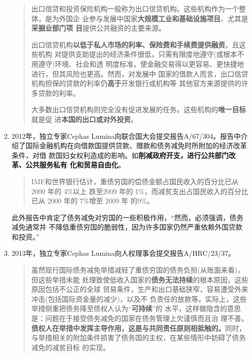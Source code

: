 \begin{enumerate}
\begin{quotation}
    出口信贷和投资保险机构一般称为出口信贷机构。这些机构作为一个整体，是为外国企
    业参与发展中国家\textbf{大规模工业和基础设施项目}、尤其是\textbf{采掘业部门项
      目}提供公共融资的主要来源。

    出口信贷机构\textbf{以低于私人市场的利率、保险费和手续费提供融资}，且这些机构
    对提供支助提出的经济条件很低，只需有限度地遵守(或根本不用遵守)环境、社会和透
    明度标准，使金融交易得以更容易、更快捷地进行，但其风险也更高。然而，对发展中
    国家的借款人而言，出口信贷机构担保的贷款的利率仍\textbf{高于}开发银行或机构等
    其他官方来源提供的许多贷款的利率。

    大多数出口信贷机构则完全没有促进发展的任务。这些机构的\textbf{唯一目标}就是促
    进\textbf{本国的出口或对外投资}。
  \end{quotation}

\item 2012年，独立专家Cephas Lumina向联合国大会提交报告A/67/304。报告中介
  绍了国际金融机构在向借款国提供贷款、赠款和债务减免时所附加的经济改革条件，对借
  款国妇女权利造成的影响。如\textbf{削减政府开支，进行公共部门改革、公共服务私有
    化和贸易自由化}。
  \begin{quotation}
    IMF和世界银行估计，重债穷国的偿债金额占国民收入的百分比已从 2000 年的 4\%以上
    跌至2009 年的 1\%，而减贫支出占国民收入的百分比已从 2000 年的 7\%增至 2009 年
    的9\%。
  \end{quotation}

  此外报告中肯定了债务减免对穷国的一些积极作用，“然而，必须强调，债务减免通常并
  不降低重债穷国的脆弱性，因为许多国家仍然严重依赖外国贷款和投资。”

\item 2013年，独立专家Cephas Lumina向人权理事会提交报告A/HRC/23/37。

  \begin{quotation}
    虽然现行国际债务减免举措减轻了重债穷国的债务负担(从账面来看)，但这些举措未能
    处理致使低收入国家的\textbf{债务无法持续}的根本原因，这些原因包括不公正的全球
    贸易条件，生产和出口基础狭窄，容易遭受外来冲击(包括国际资金量的减少)，以及不
    负责任的放款等。实际上，这些举措侧重把债务降至债权人认为“\textbf{可持续}”的
    水平，这样做隐含的意思是：问题在于接受债务减免的国家在债务管理上欠谨慎而且治
    理不善。\textbf{债权人在举措中发挥主导作用，这是与共同责任原则相抵触的。}同时，
    与举措相关的附加条件损害了债务国的主权，在某些情形中妨碍了债务减免的减贫目标
    的实现。
  \end{quotation}


\end{enumerate}
